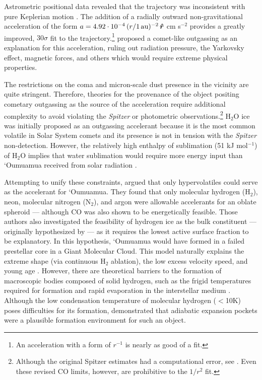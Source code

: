 \documentclass[twocolumn,doublespacing]{aastex631}
\begin{document}
Astrometric positional data revealed that the trajectory was inconsistent with pure Keplerian motion \citep{micheli2018}. The addition of a radially outward non-gravitational acceleration of the form $a=4.92\cdot10^{-4}\, (r/1\, {\rm au})^{-2}\, \boldsymbol{\hat{r}}$ cm s$^{-2}$ provides a greatly improved, $30\sigma$ fit to the trajectory.\footnote{An acceleration with a form of $r^{-1}$ is nearly as good of a fit.} \citet{micheli2018} proposed a comet-like outgassing as an explanation for this acceleration, ruling out radiation pressure, the Yarkovsky effect, magnetic forces, and others which would require extreme physical properties.

The restrictions on the coma and micron-scale dust presence in the vicinity are quite stringent. Therefore, theories for the provenance of the object positing cometary outgassing as the source of the acceleration require additional complexity to avoid violating the \textit{Spitzer} or photometric observations.\footnote{Although the original Spitzer estimates had a computational error, see \citet{seligman2021}. Even these revised CO limits, however, are prohibitive to the $1/r^2$ fit.} H$_2$O ice was initially proposed as an outgassing accelerant because it is the most common volatile in Solar System comets \citep{Rickman2010,Ahearn2012,Ootsubo2012,Cochran2015,Biver2016,Bockelee2017} and its presence is not in tension with the \textit{Spitzer} non-detection. However, the relatively high enthalpy of sublimation (51 kJ mol$^{-1}$) of H$_2$O implies that water sublimation would require more energy input than `Oumuamua received from solar radiation \citep{sekanina2019}.

Attempting to unify these constraints, \citet{SL2020} argued that only hypervolatiles could serve as the accelerant for `Oumuamua. They found that only molecular hydrogen (H$_2$), neon, molecular nitrogen (N$_2$), and argon were allowable accelerants for an oblate spheroid --- although CO was also shown to be energetically feasible. Those authors also investigated the feasibility of hydrogen ice as the bulk constituent --- originally hypothesized by \citet{fuglistaler2018solid} --- as it requires the lowest active surface fraction to be explanatory. In this hypothesis, `Oumuamua would have formed in a failed prestellar core in a Giant Molecular Cloud. This model naturally explains the extreme shape (via continuous H$_2$ ablation), the low excess velocity speed, and young age \citep{mamajek2017,Gaidos2017a, Feng2018,Fernandes2018,hallatt2020,Hsieh2021}. However, there are theoretical barriers to the formation of macroscopic bodies composed of solid hydrogen, such as the frigid temperatures required for formation and rapid evaporation in the interstellar medium \citep{hoang2020,phan2021,levine2021,LL2021}. Although the low condensation temperature of molecular hydrogen ($<$10K) poses difficulties for its formation, \citet{LL2021} demonstrated that adiabatic expansion pockets were a plausible formation environment for such an object.
\end{document}
